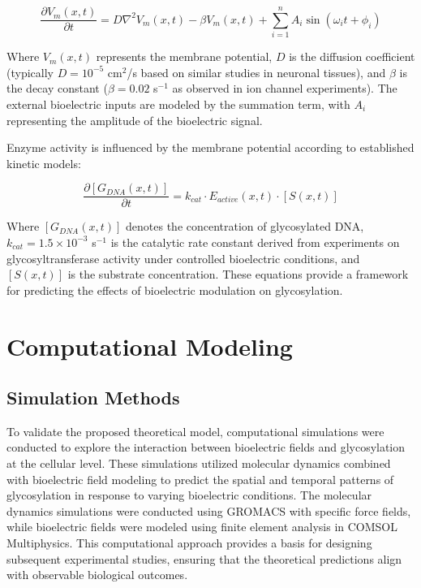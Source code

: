 \documentclass[12pt]{article}
\begin{document}
\begin{equation}
\frac{\partial V_m(x,t)}{\partial t} = D \nabla^2 V_m(x,t) - \beta V_m(x,t) + \sum_{i=1}^{n} A_i \sin(\omega_i t + \phi_i)
\end{equation}

Where \(V_m(x,t)\) represents the membrane potential, \(D\) is the diffusion coefficient (typically \(D = 10^{-5}\) cm\(^2\)/s based on similar studies in neuronal tissues), and \(\beta\) is the decay constant (\(\beta = 0.02\) s\(^{-1}\) as observed in ion channel experiments). The external bioelectric inputs are modeled by the summation term, with \(A_i\) representing the amplitude of the bioelectric signal.

Enzyme activity is influenced by the membrane potential according to established kinetic models:

\begin{equation}
\frac{\partial [G_{DNA}(x,t)]}{\partial t} = k_{cat} \cdot E_{active}(x,t) \cdot [S(x,t)]
\end{equation}

Where \([G_{DNA}(x,t)]\) denotes the concentration of glycosylated DNA, \(k_{cat} = 1.5 \times 10^{-3} \) s\(^{-1}\) is the catalytic rate constant derived from experiments on glycosyltransferase activity under controlled bioelectric conditions, and \([S(x,t)]\) is the substrate concentration. These equations provide a framework for predicting the effects of bioelectric modulation on glycosylation.

\section{Computational Modeling}

\subsection{Simulation Methods}
To validate the proposed theoretical model, computational simulations were conducted to explore the interaction between bioelectric fields and glycosylation at the cellular level. These simulations utilized molecular dynamics combined with bioelectric field modeling to predict the spatial and temporal patterns of glycosylation in response to varying bioelectric conditions. The molecular dynamics simulations were conducted using GROMACS with specific force fields, while bioelectric fields were modeled using finite element analysis in COMSOL Multiphysics. This computational approach provides a basis for designing subsequent experimental studies, ensuring that the theoretical predictions align with observable biological outcomes.
\end{document}
